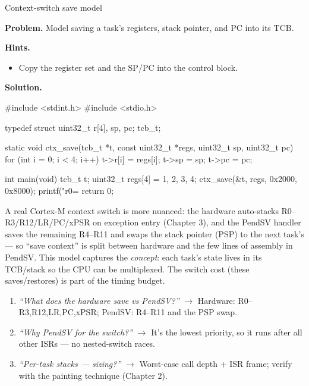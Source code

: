 \begin{gymproblem}{Context-switch save model}

\textbf{Problem.} Model saving a task's registers, stack pointer, and PC into
its TCB.

\textbf{Hints.}
\begin{itemize}
\item Copy the register set and the SP/PC into the control block.
\end{itemize}

\attempt

\textbf{Solution.}
\begin{cgym}
#include <stdint.h>
#include <stdio.h>

typedef struct { uint32_t r[4], sp, pc; } tcb_t;

static void ctx_save(tcb_t *t, const uint32_t *regs, uint32_t sp, uint32_t pc) {
    for (int i = 0; i < 4; i++) t->r[i] = regs[i];
    t->sp = sp;
    t->pc = pc;
}

int main(void) {
    tcb_t t;
    uint32_t regs[4] = {1, 2, 3, 4};
    ctx_save(&t, regs, 0x2000, 0x8000);
    printf("r0=%
    return 0;
}
\end{cgym}

A real Cortex-M context switch is more nuanced: the hardware auto-stacks
R0--R3/R12/LR/PC/xPSR on exception entry (Chapter 3), and the PendSV handler
saves the remaining R4--R11 and swaps the stack pointer (PSP) to the next task's
--- so ``save context'' is split between hardware and the few lines of
assembly in PendSV. This model captures the \emph{concept}: each task's state
lives in its TCB/stack so the CPU can be multiplexed. The switch cost (these
saves/restores) is part of the timing budget.

\followups
\begin{enumerate}
\item \emph{``What does the hardware save vs PendSV?''} $\rightarrow$ Hardware:
  R0--R3,R12,LR,PC,xPSR; PendSV: R4--R11 and the PSP swap.
\item \emph{``Why PendSV for the switch?''} $\rightarrow$ It's the lowest
  priority, so it runs after all other ISRs --- no nested-switch races.
\item \emph{``Per-task stacks --- sizing?''} $\rightarrow$ Worst-case call depth
  + ISR frame; verify with the painting technique (Chapter 2).
\end{enumerate}
\end{gymproblem}

